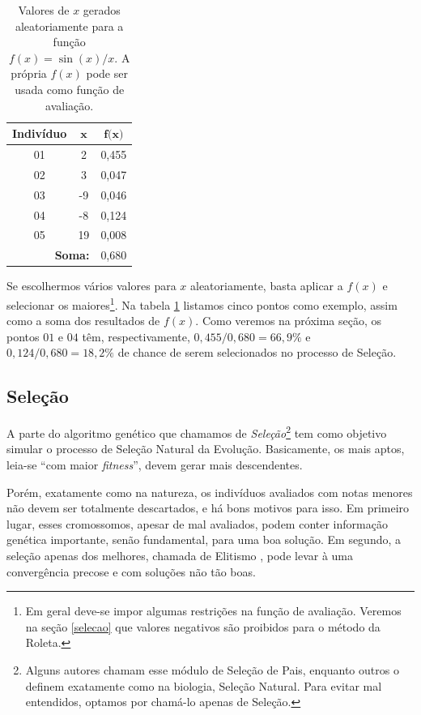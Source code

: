 	
	\begin{table}[htp]		
		\caption{\label{tabSen}Valores de $x$ gerados aleatoriamente para a função $f(x) = \sin(x)/x$. A própria $f(x)$ pode ser usada como função de avaliação.}
		\begin{center}
			\begin{tabular}{c|c|c}
				\hline
				\textbf{Indivíduo}& $\textbf{x}$		& $\textbf{f(x)}$ \\
				\hline
				01 & 	2							& 0,455 \\
				02 & 	3							& 0,047 \\
				03 &	-9						& 0,046\\	
				04 &	-8							& 0,124 \\
				05 &	19							& 	0,008 \\
				\hline
				\multicolumn{2}{r}{\textbf{Soma:}} & 0,680 \\
				\hline
			\end{tabular}
		\end{center}
	\end{table}
	
	
	Se escolhermos vários valores para $x$ aleatoriamente, basta aplicar a $f(x)$ e selecionar os maiores\footnote{Em geral deve-se impor algumas restrições na função de avaliação. Veremos na seção \ref{selecao} que valores negativos são proibidos para o método da Roleta.}. Na tabela \ref{tabSen} listamos cinco pontos como exemplo, assim como a soma dos resultados de $f(x)$. Como veremos na próxima seção, os pontos $01$ e $04$ têm, respectivamente, $0,455/0,680 = 66,9\%$ e $ 0,124/0,680 = 18,2\%$ de chance de serem selecionados no processo de Seleção.
	
	\subsection{\label{selecao}Seleção}
	
	A parte do algoritmo genético que chamamos de \textit{Seleção}\footnote{Alguns autores chamam esse módulo de Seleção de Pais, enquanto outros o definem exatamente como na biologia, Seleção Natural. Para evitar mal entendidos, optamos por chamá-lo apenas de Seleção.} tem como objetivo simular o processo de Seleção Natural da Evolução. Basicamente, os  mais aptos, leia-se ``com maior \textit{fitness}'', devem gerar mais descendentes.
	
	Porém, exatamente como na natureza, os indivíduos avaliados com notas menores não devem ser totalmente descartados, e há bons motivos para isso. Em primeiro lugar, esses cromossomos, apesar de mal avaliados, podem conter informação genética importante, senão fundamental, para uma boa solução. Em segundo, a seleção apenas dos melhores, chamada de Elitismo \cite{Bhattacharyya2004}, pode levar à uma convergência precose e com soluções não tão boas.
	

